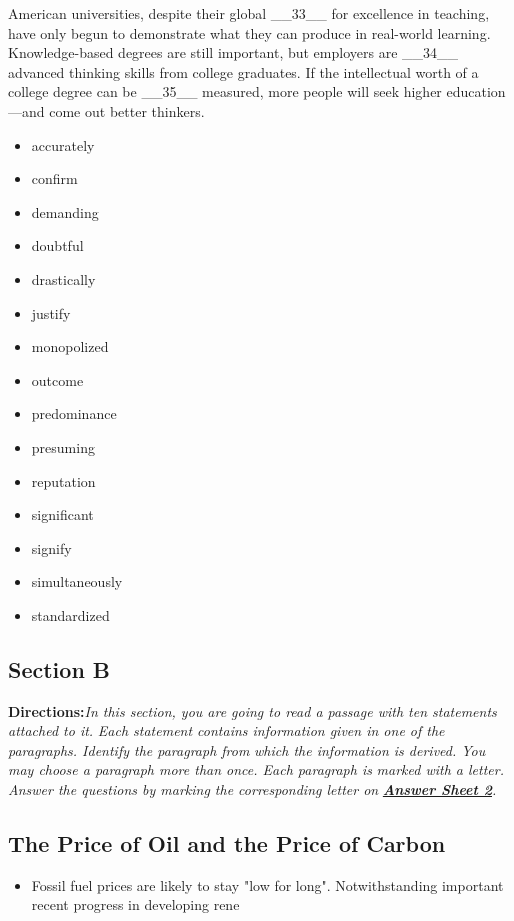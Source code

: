 \documentclass[UTF8,11pt]{ctexart}
\begin{document}
American universities, despite their global \_\_33\_\_ for excellence in teaching, have only begun to demonstrate what they can produce in real-world learning. Knowledge-based degrees are still important, but employers are \_\_34\_\_ advanced thinking skills from college graduates. If the intellectual worth of a college degree can be \_\_35\_\_ measured, more people will seek higher education—and come out better thinkers.


\begin{itemize}[leftmargin=2em,itemsep=.2em,topsep=.4em]\item[A.] accurately
\item[B.] confirm
\item[C.] demanding
\item[D.] doubtful
\item[E.] drastically
\item[F.] justify
\item[G.] monopolized
\item[H.] outcome
\item[I.] predominance
\item[J.] presuming
\item[K.] reputation
\item[L.] significant
\item[M.] signify
\item[N.] simultaneously
\item[O.] standardized
\end{itemize}

\subsection*{\textbf{Section B}}


\textbf{Directions:}\textit{In this section, you are going to read a passage with ten statements attached to it.} \textit{Each statement contains information given in one of the paragraphs. Identify the paragraph from} \textit{which the information is derived. You may choose a paragraph more than once. Each paragraph is} \textit{marked with a letter. Answer the questions by marking the corresponding letter on}\textbf{\textit{ }}\textbf{\textit{\uline{Answer Sheet 2}}}\textit{.}


\subsection*{\textbf{The Price of Oil and the Price of Carbon}}


\begin{itemize}[leftmargin=2em,itemsep=.2em,topsep=.4em]\item[A.] Fossil fuel prices are likely to stay "low for long". Notwithstanding important recent progress in developing rene
\end{itemize}
\end{document}
